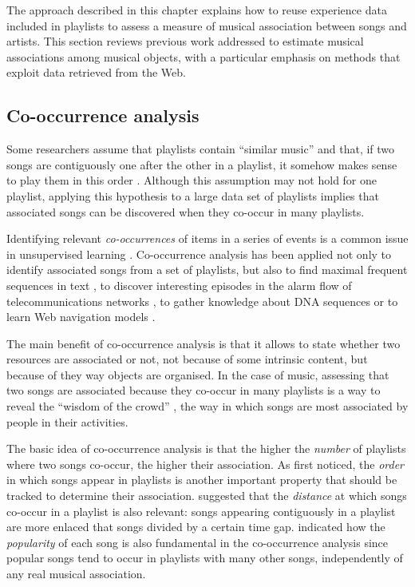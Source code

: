 The approach described in this chapter explains how to reuse experience data included in playlists to assess a measure of musical association between songs and artists.
This section reviews previous work addressed to estimate musical associations among musical objects, with a particular emphasis on methods that exploit data retrieved from the Web.


\subsection{Co-occurrence analysis} %
\label{sub:co_occurrence_analysis}

Some researchers assume that playlists contain ``similar music'' \cite{Logan03} and that, if two songs are contiguously one after the other in a playlist, it somehow makes sense to play them in this order \cite{Andric06}.
Although this assumption may not hold for one playlist, applying this hypothesis to a large data set of playlists implies that associated songs can be discovered when they co-occur in many playlists.

Identifying relevant \emph{co-occurrences} of items in a series of events is a common issue in unsupervised learning \cite{Hofmann98}.
Co-occurrence analysis has been applied not only to identify associated songs from a set of playlists, but also to find  maximal frequent sequences in text \cite{Ahonen99}, to discover interesting episodes in the alarm flow of telecommunications networks \cite{Mannila97}, to gather knowledge about DNA sequences \cite{Wang97} or to learn Web navigation models \cite{Nakagawa03}.

The main benefit of co-occurrence analysis is that it allows to state whether two resources are associated or not, not because of some intrinsic content, but because of they way objects are organised.
%
In the case of music, assessing that two songs are associated because they co-occur in many playlists is a way to reveal the ``wisdom of the crowd'' \cite{Surowiecki04}, the way in which songs are most associated by people in their activities.

The basic idea of co-occurrence analysis is that the higher the \emph{number} of playlists where two songs co-occur, the higher their association.
As \citet{Andric06} first noticed, the \emph{order} in which songs appear in playlists is another important property that should be tracked to determine their association.
\citet{Ragno05} suggested that the \emph{distance} at which songs co-occur in a playlist is also relevant: songs appearing contiguously in a playlist are more enlaced that songs divided by a certain time gap.
\citet{Pachet01} indicated how the \emph{popularity} of each song is also fundamental in the co-occurrence analysis since popular songs tend to occur in playlists with many other songs, independently of any real musical association.

